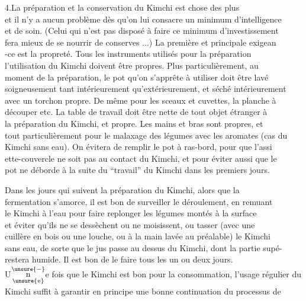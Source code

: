 4.\quad La préparation et la conservation du Kimchi est chose des plus \\
et il n'y a aucun problème dès qu'on lui consacre un minimum d'intelligence\\
et de soin. (Celui qui n'est pas disposé à faire ce minimum d'investissement\\
fera mieux de se nourrir de conserves ...) La première et principale exigean\\
-ce est la propreté. Tous les instruments utilisés pour la préparation \\
l'utilisation du Kimchi doivent être propres. Plus particulièrement, au\\
moment de la préparation, le pot qu'on s'apprête à utiliser doit être lavé\\
soigneusement tant intérieurement qu'extérieurement, et séché intérieurement\\
avec un torchon propre. De même pour les sceaux et cuvettes, la planche à\\
découper etc. La table de travail doit être nette de tout objet étranger à\\
la préparation du Kimchi, et propre. Les mains et bras sont propres, et\\
tout particulièrement pour le malaxage des légumes avec les aromates (cas du\\
Kimchi sans eau). On évitera de remplir le pot à ras-bord, pour que l'assi\unsure{-}\\
ette-couvercle ne soit pas au contact du Kimchi, et pour éviter aussi que le\\
pot ne déborde à la suite du ``travail'' du Kimchi dans les premiers jours.

Dans les jours qui suivent la préparation du Kimchi, alors que la\\
fermentation s'amorce, il est bon de surveiller le déroulement, en remuant\\
le Kimchi à l'eau pour faire replonger les légumes montés à la surface\\
et éviter qu'ils ne se dessèchent ou ne moisissent, ou tasser (avec une\\
cuillère en bois ou une louche, ou à la main lavée au préalable) le Kimchi\\
sans eau, de sorte que le jus passe au dessus du Kimchi, dont la partie supé-\\
 restera humide. Il est bon de le faire tous les un ou deux jours.\\
U$\underset{\unsure{v}}{\overset{\unsure{-}}{\mathrm n}}$e fois que le Kimchi est bon pour la consommation, l'usage régulier du\\
Kimchi suffit à garantir en principe une bonne continuation du processus de
